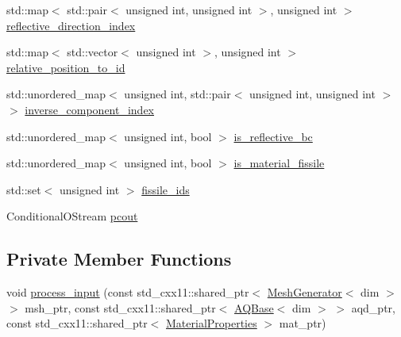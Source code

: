 \begin{DoxyCompactItemize}
\item 
std\+::map$<$ std\+::pair$<$ unsigned int, unsigned int $>$, unsigned int $>$ \hyperlink{class_equation_base_a55a37edb6a0cc2ac25e31b4e8aa91e33}{reflective\+\_\+direction\+\_\+index}
\item 
std\+::map$<$ std\+::vector$<$ unsigned int $>$, unsigned int $>$ \hyperlink{class_equation_base_a53b48062132ee777856a3b340b4000b2}{relative\+\_\+position\+\_\+to\+\_\+id}
\item 
std\+::unordered\+\_\+map$<$ unsigned int, std\+::pair$<$ unsigned int, unsigned int $>$ $>$ \hyperlink{class_equation_base_a1d2e520638913dfeb4e16f3a09911836}{inverse\+\_\+component\+\_\+index}
\item 
std\+::unordered\+\_\+map$<$ unsigned int, bool $>$ \hyperlink{class_equation_base_a91757532b2fd3759a976b22a83a9f8d8}{is\+\_\+reflective\+\_\+bc}
\item 
std\+::unordered\+\_\+map$<$ unsigned int, bool $>$ \hyperlink{class_equation_base_a2568ffad6a52d3bf3227eea51a314cb4}{is\+\_\+material\+\_\+fissile}
\item 
std\+::set$<$ unsigned int $>$ \hyperlink{class_equation_base_aafa902bf78cf78770557098fa9027188}{fissile\+\_\+ids}
\item 
Conditional\+O\+Stream \hyperlink{class_equation_base_a12dd28de05c41d4dd3ec30e7195bfa97}{pcout}
\end{DoxyCompactItemize}
\subsection*{Private Member Functions}
\begin{DoxyCompactItemize}
\item 
void \hyperlink{class_equation_base_afd853e7e9fd859216a705a517235c6ba}{process\+\_\+input} (const std\+\_\+cxx11\+::shared\+\_\+ptr$<$ \hyperlink{class_mesh_generator}{Mesh\+Generator}$<$ dim $>$ $>$ msh\+\_\+ptr, const std\+\_\+cxx11\+::shared\+\_\+ptr$<$ \hyperlink{class_a_q_base}{A\+Q\+Base}$<$ dim $>$ $>$ aqd\+\_\+ptr, const std\+\_\+cxx11\+::shared\+\_\+ptr$<$ \hyperlink{class_material_properties}{Material\+Properties} $>$ mat\+\_\+ptr)
\end{DoxyCompactItemize}
